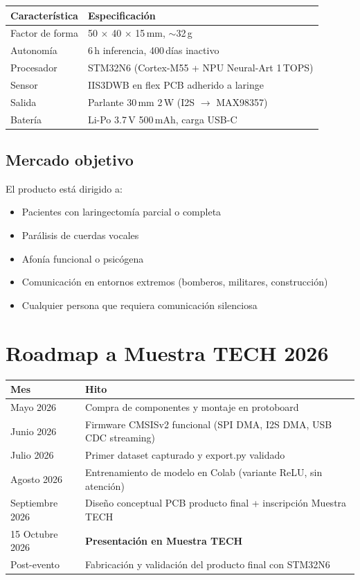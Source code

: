 \documentclass[10pt,a4paper]{article}
\begin{document}
\begin{tabularx}{\textwidth}{l X}
\toprule
\textbf{Característica} & \textbf{Especificación} \\
\midrule
Factor de forma & 50 $\times$ 40 $\times$ 15\,mm, $\sim$32\,g\\
Autonomía & 6\,h inferencia, 400\,días inactivo\\
Procesador & STM32N6 (Cortex-M55 + NPU Neural-Art 1\,TOPS)\\
Sensor & IIS3DWB en flex PCB adherido a laringe\\
Salida & Parlante 30\,mm 2\,W (I2S $\to$ MAX98357)\\
Batería & Li-Po 3.7\,V 500\,mAh, carga USB-C\\
\bottomrule
\end{tabularx}

\subsection*{Mercado objetivo}

El producto está dirigido a:
\begin{itemize}
\item Pacientes con laringectomía parcial o completa
\item Parálisis de cuerdas vocales
\item Afonía funcional o psicógena
\item Comunicación en entornos extremos (bomberos, militares, construcción)
\item Cualquier persona que requiera comunicación silenciosa
\end{itemize}

\section{Roadmap a Muestra TECH 2026}

\begin{tabularx}{\textwidth}{l X}
\toprule
\textbf{Mes} & \textbf{Hito} \\
\midrule
Mayo 2026 & Compra de componentes y montaje en protoboard\\
Junio 2026 & Firmware CMSISv2 funcional (SPI DMA, I2S DMA, USB CDC streaming)\\
Julio 2026 & Primer dataset capturado y export.py validado\\
Agosto 2026 & Entrenamiento de modelo en Colab (variante ReLU, sin atención)\\
Septiembre 2026 & Diseño conceptual PCB producto final + inscripción Muestra TECH\\
15 Octubre 2026 & \textbf{Presentación en Muestra TECH}\\
Post-evento & Fabricación y validación del producto final con STM32N6\\
\bottomrule
\end{tabularx}
\end{document}
